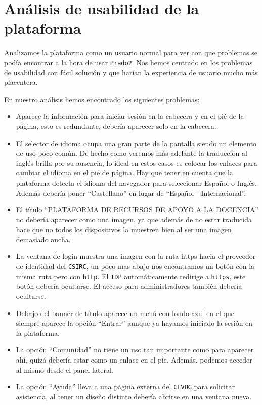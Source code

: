 \section{Análisis de usabilidad de la plataforma}

Analizamos la plataforma como un usuario normal para ver con que problemas se podía encontrar a la hora de usar \texttt{Prado2}. Nos hemos centrado en los problemas de usabilidad con fácil solución y que harían la experiencia de usuario mucho más placentera.

\bigskip
En nuestro análisis hemos encontrado los siguientes problemas:

\begin{itemize}

\item Aparece la información para iniciar sesión en la cabecera y en el pié de la página, esto es redundante, debería aparecer solo en la cabecera.
\item El selector de idioma ocupa una gran parte de la pantalla siendo un elemento de uso poco común. De hecho como veremos más adelante la traducción al inglés brilla por su ausencia, lo ideal en estos casos es colocar los enlaces para cambiar el idioma en el pié de página. Hay que tener en cuenta que la plataforma detecta el idioma del navegador para seleccionar Español o Inglés. Además debería poner ``Castellano'' en lugar de ``Español - Internacional''.
\item El título ``PLATAFORMA DE RECURSOS DE APOYO A LA DOCENCIA'' no debería aparecer como una imagen, ya que además de no estar traducida hace que no todos los dispositivos la muestren bien al ser una imagen demasiado ancha.
\item La ventana de login muestra una imagen con la ruta https hacia el proveedor de identidad del \texttt{CSIRC}, un poco mas abajo nos encontramos un botón con la misma ruta pero con \texttt{http}. El \texttt{IDP} automáticamente redirige a \texttt{https}, este botón debería ocultarse. El acceso para administradores también debería ocultarse.
\item Debajo del banner de título aparece un menú con fondo azul en el que siempre aparece la opción ``Entrar'' aunque ya hayamos iniciado la sesión en la plataforma.
\item La opción ``Comunidad'' no tiene un uso tan importante como para aparecer ahí, quizá debería estar como un enlace en el pie. Además, podemos acceder al mismo desde el panel lateral.
\item La opción ``Ayuda'' lleva a una página externa del \texttt{CEVUG} para solicitar asistencia, al tener un diseño distinto debería abrirse en una ventana nueva.

\end{itemize}
